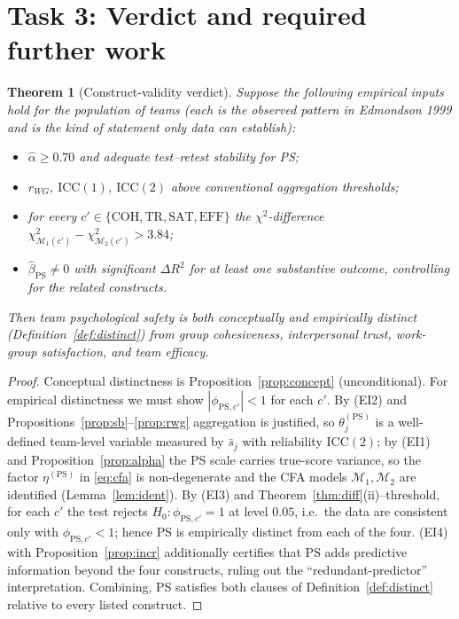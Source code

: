 \documentclass{amsart}
\newtheorem{theorem}{Theorem}
\theoremstyle{remark}
\begin{document}
\section{Task 3: Verdict and required further work}\label{sec:verdict}

\begin{theorem}[Construct-validity verdict]\label{thm:verdict}
Suppose the following empirical inputs hold for the population of teams (each is the
observed pattern in Edmondson 1999 and is the kind of statement only data can
establish):
\begin{itemize}
\item[(EI1)] $\hat\alpha\ge0.70$ and adequate test--retest stability for PS;
\item[(EI2)] $r_{WG}$, $\mathrm{ICC}(1)$, $\mathrm{ICC}(2)$ above conventional
aggregation thresholds;
\item[(EI3)] for every $c'\in\{\mathrm{COH,TR,SAT,EFF}\}$ the $\chi^2$-difference
$\chi^2_{\mathcal M_1(c')}-\chi^2_{\mathcal M_2(c')}>3.84$;
\item[(EI4)] $\hat\beta_{\mathrm{PS}}\neq0$ with significant $\Delta R^2$ for at
least one substantive outcome, controlling for the related constructs.
\end{itemize}
Then team psychological safety is \emph{both conceptually and empirically distinct}
(Definition~\ref{def:distinct}) from group cohesiveness, interpersonal trust,
work-group satisfaction, and team efficacy.
\end{theorem}
\begin{proof}
Conceptual distinctness is Proposition~\ref{prop:concept} (unconditional). For
empirical distinctness we must show $|\phi_{\mathrm{PS},c'}|<1$ for each $c'$.
By (EI2) and Propositions~\ref{prop:sb}--\ref{prop:rwg} aggregation is justified, so
$\theta^{(\mathrm{PS})}_j$ is a well-defined team-level variable measured by
$\bar s_j$ with reliability $\mathrm{ICC}(2)$; by (EI1) and
Proposition~\ref{prop:alpha} the PS scale carries true-score variance, so the
factor $\eta^{(\mathrm{PS})}$ in \eqref{eq:cfa} is non-degenerate and the CFA models
$\mathcal M_1,\mathcal M_2$ are identified (Lemma~\ref{lem:ident}). By (EI3) and
Theorem~\ref{thm:diff}(ii)--threshold, for each $c'$ the test rejects
$H_0:\phi_{\mathrm{PS},c'}=1$ at level $0.05$, i.e.\ the data are consistent only
with $\phi_{\mathrm{PS},c'}<1$; hence PS is empirically distinct from each of the
four. (EI4) with Proposition~\ref{prop:incr} additionally certifies that PS adds
predictive information beyond the four constructs, ruling out the
``redundant-predictor'' interpretation. Combining, PS satisfies both clauses of
Definition~\ref{def:distinct} relative to every listed construct. \end{proof}
\end{document}

